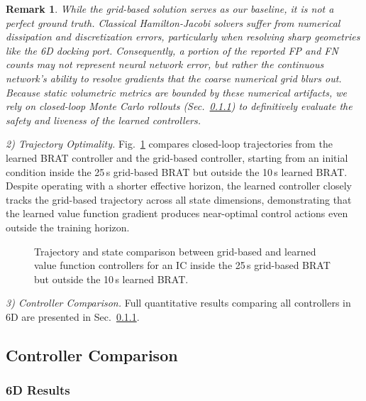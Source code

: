 \documentclass[letterpaper, 10 pt, conference]{ieeeconf}
\newtheorem{remark}{Remark}
\begin{document}
\begin{remark}
While the grid-based solution serves as our baseline, it is not a perfect ground truth. Classical Hamilton-Jacobi solvers suffer from numerical dissipation and discretization errors, particularly when resolving sharp geometries like the 6D docking port. Consequently, a portion of the reported FP and FN counts may not represent neural network error, but rather the continuous network's ability to resolve gradients that the coarse numerical grid blurs out. Because static volumetric metrics are bounded by these numerical artifacts, we rely on closed-loop Monte Carlo rollouts (Sec.~\ref{sec:6d_comparison}) to definitively evaluate the safety and liveness of the learned controllers.
\end{remark}

\textit{2) Trajectory Optimality.}
Fig.~\ref{fig:traj_comparison} compares closed-loop trajectories from the learned BRAT controller and the grid-based controller, starting from an initial condition inside the 25\,s grid-based BRAT but outside the 10\,s learned BRAT. Despite operating with a shorter effective horizon, the learned controller closely tracks the grid-based trajectory across all state dimensions, demonstrating that the learned value function gradient produces near-optimal control actions even outside the training horizon.

   \begin{figure}[t]
      \centering
      \caption{Trajectory and state comparison between grid-based and learned value function controllers for an IC inside the 25\,s grid-based BRAT but outside the 10\,s learned BRAT.}
      \label{fig:traj_comparison}
   \end{figure}

\textit{3) Controller Comparison.}
Full quantitative results comparing all controllers in 6D are presented in Sec.~\ref{sec:6d_comparison}.
\subsection{Controller Comparison}

\subsubsection{6D Results}\label{sec:6d_comparison}
\end{document}
